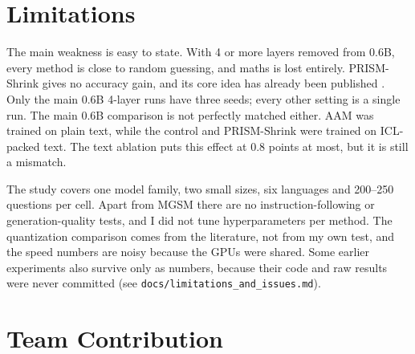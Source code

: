 \documentclass[11pt]{article}
\begin{document}
\section*{Limitations}

The main weakness is easy to state. With 4 or more layers removed from 0.6B, every method is close to random
guessing, and maths is lost entirely. PRISM-Shrink gives no accuracy gain, and its core idea has already been
published \citep{flattengpt}. Only the main 0.6B 4-layer runs have three seeds; every other setting is a single run.
The main 0.6B comparison is not perfectly matched either. AAM was trained on plain text, while the control and
PRISM-Shrink were trained on ICL-packed text. The text ablation puts this effect at 0.8 points at most, but it is
still a mismatch.

The study covers one model family, two small sizes, six languages and 200--250 questions per cell. Apart from MGSM
there are no instruction-following or generation-quality tests, and I did not tune hyperparameters per method. The
quantization comparison comes from the literature, not from my own test, and the speed numbers are noisy because the
GPUs were shared. Some earlier experiments also survive only as numbers, because their code and raw results were
never committed (see \texttt{docs/limitations\_and\_issues.md}).

\section*{Team Contribution}

\begin{table}[h]
\centering\small
{}
\end{table}



\appendix
\end{document}
